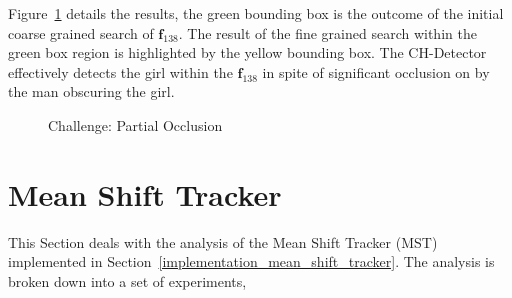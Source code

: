 Figure~\ref{fig:ch_partial_occlusion} details the results, the green bounding
box is the outcome of the initial coarse grained search of $\mathbf{f}_{138}$.
The result of the fine grained search within the green box region is highlighted
by the yellow bounding box. 
The CH-Detector effectively detects the girl within the $\mathbf{f}_{138}$ in
spite of significant occlusion on by the man obscuring the girl. 

\begin{figure}     
    \caption{Challenge: Partial Occlusion\label{fig:ch_partial_occlusion}
    }
\end{figure}


\section{Mean Shift Tracker}
This Section deals with the analysis of the Mean Shift Tracker (MST)
implemented in Section~\ref{implementation_mean_shift_tracker}. The analysis is
broken down into a set of experiments,

